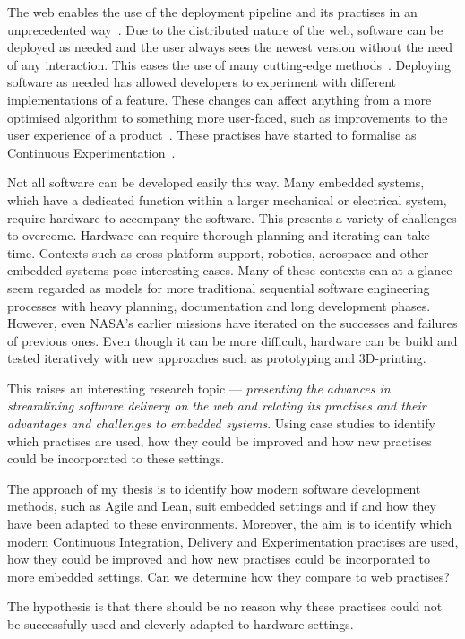 \documentclass[english]{tktltiki2}
\begin{document}
The web enables the use of the deployment pipeline and its practises in an unprecedented way~\cite{KLS09}. Due to the distributed nature of the web, software can be deployed as needed and the user always sees the newest version without the need of any interaction. This eases the use of many cutting-edge methods~\cite{KLS09}. Deploying software as needed has allowed developers to experiment with different implementations of a feature. These changes can affect anything from a more optimised algorithm to something more user-faced, such as improvements to the user experience of a product~\cite{KLS09}. These practises have started to formalise as Continuous Experimentation~\cite{FGM14}.

Not all software can be developed easily this way. Many embedded systems, which have a dedicated function within a larger mechanical or electrical system, require hardware to accompany the software. This presents a variety of challenges to overcome. Hardware can require thorough planning and iterating can take time. Contexts such as cross-platform support, robotics, aerospace and other embedded systems pose interesting cases. Many of these contexts can at a glance seem regarded as models for more traditional sequential software engineering processes with heavy planning, documentation and long development phases. However, even NASA’s earlier missions have iterated on the successes and failures of previous ones. Even though it can be more difficult, hardware can be build and tested iteratively with new approaches such as prototyping and 3D-printing.

This raises an interesting research topic — \emph{presenting the advances in streamlining software delivery on the web and relating its practises and their advantages and challenges to embedded systems}. Using case studies to identify which practises are used, how they could be improved and how new practises could be incorporated to these settings.

The approach of my thesis is to identify how modern software development methods, such as Agile and Lean, suit embedded settings and if and how they have been adapted to these environments. Moreover, the aim is to identify which modern Continuous Integration, Delivery and Experimentation practises are used, how they could be improved and how new practises could be incorporated to more embedded settings. Can we determine how they compare to web practises?

The hypothesis is that there should be no reason why these practises could not be successfully used and cleverly adapted to hardware settings.
\end{document}
